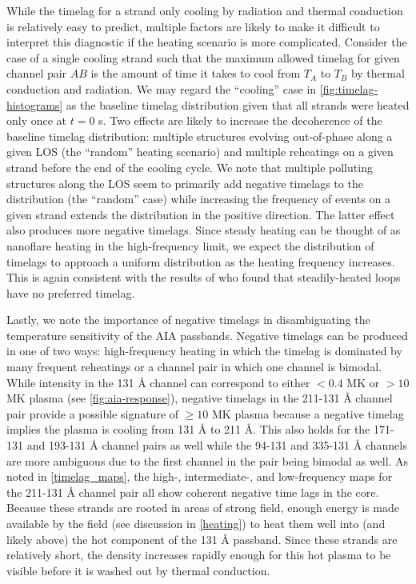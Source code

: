 While the timelag for a strand only cooling by radiation and thermal conduction is relatively easy to predict, multiple factors are likely to make it difficult to interpret this diagnostic if the heating scenario is more complicated. Consider the case of a single cooling strand such that the maximum allowed timelag for given channel pair $AB$ is the amount of time it takes to cool from $T_A$ to $T_B$ by thermal conduction and radiation. We may regard the ``cooling'' case in \autoref{fig:timelag-histograms} as the baseline timelag distribution given that all strands were heated only once at $t=0$ s. Two effects are likely to increase the decoherence of the baseline timelag distribution: multiple structures evolving out-of-phase along a given LOS (the ``random'' heating scenario) and multiple reheatings on a given strand before the end of the cooling cycle. We note that multiple polluting structures along the LOS seem to primarily add negative timelags to the distribution (the ``random'' case) while increasing the frequency of events on a given strand extends the distribution in the positive direction. The latter effect also produces more negative timelags. Since steady heating can be thought of as nanoflare heating in the high-frequency limit, we expect the distribution of timelags to approach a uniform distribution as the heating frequency increases. This is again consistent with the results of \citet{viall_signatures_2016} who found that steadily-heated loops have no preferred timelag.

Lastly, we note the importance of negative timelags in disambiguating the temperature sensitivity of the AIA passbands. Negative timelags can be produced in one of two ways: high-frequency heating in which the timelag is dominated by many frequent reheatings or a channel pair in which one channel is bimodal. While intensity in the 131 \AA{} channel can correspond to either $<0.4$ MK or $>10$ MK plasma (see \autoref{fig:aia-response}), negative timelags in the 211-131 \AA{} channel pair provide a possible signature of $\ge10$ MK plasma because a negative timelag implies the plasma is cooling from 131 \AA{} to 211 \AA{}. This also holds for the 171-131 and 193-131 \AA{} channel pairs as well while the 94-131 and 335-131 \AA{} channels are more ambiguous due to the first channel in the pair being bimodal as well. As noted in \autoref{timelag_maps}, the high-, intermediate-, and low-frequency maps for the 211-131 \AA{} channel pair all show coherent negative time lags in the core. Because these strands are rooted in areas of strong field, enough energy is made available by the field (see discussion in \autoref{heating}) to heat them well into (and likely above) the hot component of the 131 \AA{} passband. Since these strands are relatively short, the density increases rapidly enough for this hot plasma to be visible before it is washed out by thermal conduction.
